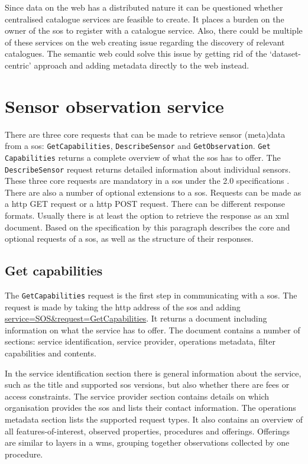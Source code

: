 Since data on the web has a distributed nature it can be questioned whether centralised catalogue services are feasible to create. It places a burden on the owner of the \ac{sos} to register with a catalogue service. Also, there could be multiple of these services on the web creating issue regarding the discovery of relevant catalogues. The semantic web could solve this issue by getting rid of the `dataset-centric' approach and adding metadata directly to the web instead.

\section{Sensor observation service}
There are three core requests that can be made to retrieve sensor (meta)data from a \ac{sos}: \texttt{GetCapabilities}, \texttt{DescribeSensor} and \texttt{GetObservation}. \texttt{Get} \texttt{Capabilities} returns a complete overview of what the \ac{sos} has to offer. The \texttt{DescribeSensor} request returns detailed information about individual sensors. These three core requests are mandatory in a \ac{sos} under the 2.0 specifications \citep{SW:OGC2}. There are also a number of optional extensions to a \ac{sos}. Requests can be made as a \ac{http} GET request or a \ac{http} POST request. There can be different response formats. Usually there is at least the option to retrieve the response as an \ac{xml} document. Based on the specification by \cite{SW:OGC2} this paragraph describes the core and optional requests of a \ac{sos}, as well as the structure of their responses. 

\subsection{Get capabilities}
The \texttt{GetCapabilities} request is the first step in communicating with a \ac{sos}. The request is made by taking the \ac{http} address of the \ac{sos} and adding \url{service=SOS\&request=GetCapabilities}. It returns a document including information on what the service has to offer. The document contains a number of sections: service identification, service provider, operations metadata, filter capabilities and contents. 

In the service identification section there is general information about the service, such as the title and supported \ac{sos} versions, but also whether there are fees or access constraints. The service provider section contains details on which organisation provides the \ac{sos} and lists their contact information. The operations metadata section lists the supported request types. It also contains an overview of all features-of-interest, observed properties, procedures and offerings. Offerings are similar to layers in a \ac{wms}, grouping together observations collected by one procedure.

